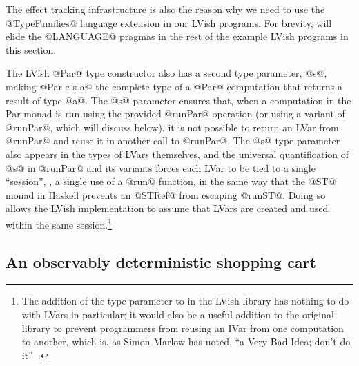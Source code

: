 The effect tracking infrastructure is also the reason why we need to
use the @TypeFamilies@ language extension in our LVish programs.  For
brevity,  will elide the @LANGUAGE@ pragmas in the rest
of the example LVish programs in this section.

The LVish @Par@ type constructor also has a second type parameter,
@s@, making @Par e s a@ the complete type of a @Par@ computation that
returns a result of type @a@.  The @s@ parameter ensures that, when a
computation in the Par monad is run using the provided @runPar@
operation (or using a variant of @runPar@, which  will discuss
below), it is not possible to return an LVar from @runPar@ and reuse
it in another call to @runPar@.  The @s@ type parameter also appears
in the types of LVars themselves, and the universal quantification of
@s@ in @runPar@ and its variants forces each LVar to be tied to a
single ``session'', \ie, a single use of a @run@ function, in the same
way that the @ST@ monad in Haskell prevents an @STRef@ from escaping
@runST@.  Doing so allows the LVish implementation to assume that
LVars are created and used within the same session.\footnote{The
  addition of the  type parameter to  in the LVish
  library has nothing to do with LVars in particular; it would also be
  a useful addition to the original  library to prevent
  programmers from reusing an IVar from one  computation to
  another, which is, as Simon Marlow has noted, ``a Very Bad Idea;
  don't do it''~\cite{marlow-book}.}

\subsection{An observably deterministic shopping cart}\label{subsection:lvish-container-lvars}

